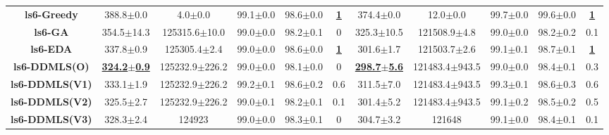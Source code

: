 \documentclass[lettersize,journal]{IEEEtran}
\begin{document}
\begin{table}[!t]
{\begin{tabular}{ccccccccccc}
        \midrule
        {\bfseries ls6-Greedy} &388.8$\pm$0.0 &4.0$\pm$0.0 & 99.1$\pm$0.0 &98.6$\pm$0.0 &\underline{\bfseries 1} &374.4$\pm$0.0 &12.0$\pm$0.0& 99.7$\pm$0.0 &99.6$\pm$0.0 &\underline{\bfseries 1} \\
        {\bfseries ls6-GA} &354.5$\pm$14.3 &125315.6$\pm$10.0 & 99.0$\pm$0.0 &98.2$\pm$0.1 &0 &325.3$\pm$10.5 &121508.9$\pm$4.8& 99.0$\pm$0.0 &98.2$\pm$0.2 &0.1 \\
        {\bfseries ls6-EDA} &337.8$\pm$0.9 &125305.4$\pm$2.4 & 99.0$\pm$0.0 &98.6$\pm$0.0 &\underline{\bfseries 1} &301.6$\pm$1.7 &121503.7$\pm$2.6& 99.1$\pm$0.1 &98.7$\pm$0.1 &\underline{\bfseries 1} \\
        {\bfseries ls6-DDMLS(O)} &\underline{\bfseries324.2$\pm$0.9} &125232.9$\pm$226.2 & 99.0$\pm$0.0 &98.1$\pm$0.0 &0 &\underline{\bfseries298.7$\pm$5.6} &121483.4$\pm$943.5& 99.0$\pm$0.0 &98.4$\pm$0.1 &0.3 \\
        {\bfseries ls6-DDMLS(V1)} &333.1$\pm$1.9 &125232.9$\pm$226.2 & 99.2$\pm$0.1 &98.6$\pm$0.2 &0.6 &311.5$\pm$7.0 &121483.4$\pm$943.5& 99.3$\pm$0.1 &98.6$\pm$0.3 &0.6 \\
        {\bfseries ls6-DDMLS(V2)} &325.5$\pm$2.7 &125232.9$\pm$226.2 & 99.0$\pm$0.1 &98.2$\pm$0.1 &0.1 &301.4$\pm$5.2 &121483.4$\pm$943.5& 99.1$\pm$0.2 &98.5$\pm$0.2 &0.5 \\
        {\bfseries ls6-DDMLS(V3)} &328.3$\pm$2.4 &124923 & 99.0$\pm$0.0 &98.3$\pm$0.1 &0 &304.7$\pm$3.2 &121648& 99.1$\pm$0.0 &98.4$\pm$0.1 &0.1 \\
        
        \bottomrule
        \end{tabular}
    }
    \label{fullresult:APP}
\end{table}




\ifCLASSOPTIONcaptionsoff
  \newpage
\fi



\end{document}
